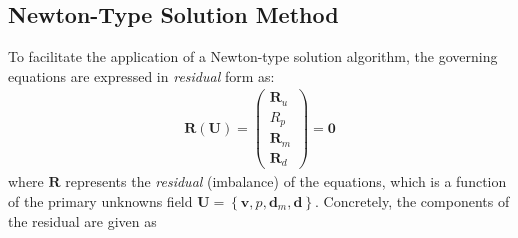 \documentclass[sn-mathphys,Numbered]{sn-jnl}%
\newcommand{\bb}{\boldsymbol}
\begin{document}
\subsection{Newton-Type Solution Method}
To facilitate the application of a Newton-type solution algorithm, the governing equations are expressed in \emph{residual} form as:
\begin{eqnarray} \label{eqn:residual}
	    \bb{R}(\bb{U}) =
	         \begin{pmatrix}
			\bb{R}_u  \\
			R_p \\
			\bb{R}_m \\
		    	\bb{R}_d
		    \end{pmatrix}
		= \bb{0}
\end{eqnarray}
where $\bb{R}$ represents the \emph{residual} (imbalance) of the equations, which is a function of the primary unknowns field $\bb{U} = \left\{\bb{v}, p, \bb{d}_m, \bb{d} \right\}$.
Concretely, the components of the residual are given as
\end{document}
